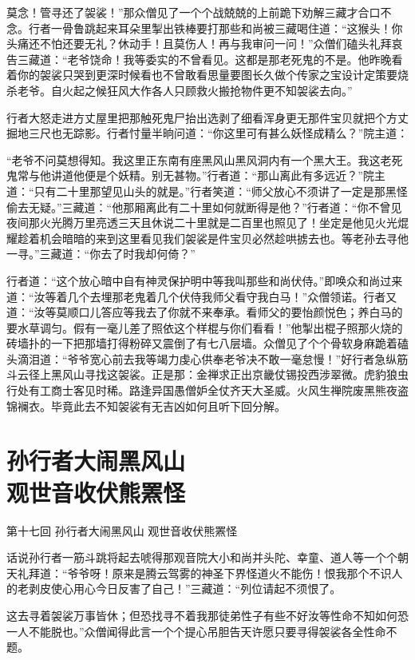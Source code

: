 \documentclass[12pt,UTF8]{ctexbook}
\begin{document}
{莫念！管寻还了袈裟！”那众僧见了一个个战兢兢的上前跪下劝解三藏才合口不念。行者一骨鲁跳起来耳朵里掣出铁棒要打那些和尚被三藏喝住道：“这猴头！你头痛还不怕还要无礼？休动手！且莫伤人！再与我审问一问！”众僧们磕头礼拜哀告三藏道：“老爷饶命！我等委实的不曾看见。这都是那老死鬼的不是。他昨晚看着你的袈裟只哭到更深时候看也不曾敢看思量要图长久做个传家之宝设计定策要烧杀老爷。自火起之候狂风大作各人只顾救火搬抢物件更不知袈裟去向。”

行者大怒走进方丈屋里把那触死鬼尸抬出选剥了细看浑身更无那件宝贝就把个方丈掘地三尺也无踪影。行者忖量半晌问道：“你这里可有甚么妖怪成精么？”院主道：

“老爷不问莫想得知。我这里正东南有座黑风山黑风洞内有一个黑大王。我这老死鬼常与他讲道他便是个妖精。别无甚物。”行者道：“那山离此有多远近？”院主道：“只有二十里那望见山头的就是。”行者笑道：“师父放心不须讲了一定是那黑怪偷去无疑。”三藏道：“他那厢离此有二十里如何就断得是他？”行者道：“你不曾见夜间那火光腾万里亮透三天且休说二十里就是二百里也照见了！坐定是他见火光焜耀趁着机会暗暗的来到这里看见我们袈裟是件宝贝必然趁哄掳去也。等老孙去寻他一寻。”三藏道：“你去了时我却何倚？”

行者道：“这个放心暗中自有神灵保护明中等我叫那些和尚伏侍。”即唤众和尚过来道：“汝等着几个去埋那老鬼着几个伏侍我师父看守我白马！”众僧领诺。行者又道：“汝等莫顺口儿答应等我去了你就不来奉承。看师父的要怡颜悦色；养白马的要水草调匀。假有一毫儿差了照依这个样棍与你们看看！”他掣出棍子照那火烧的砖墙扑的一下把那墙打得粉碎又震倒了有七八层墙。众僧见了个个骨软身麻跪着磕头滴泪道：“爷爷宽心前去我等竭力虔心供奉老爷决不敢一毫怠慢！”好行者急纵筋斗云径上黑风山寻找这袈裟。正是那：金禅求正出京畿仗锡投西涉翠微。虎豹狼虫行处有工商士客见时稀。路逢异国愚僧妒全仗齐天大圣威。火风生禅院废黑熊夜盗锦襕衣。毕竟此去不知袈裟有无吉凶如何且听下回分解。

\chapter[孙行者大闹黑风山\ 观世音收伏熊罴怪]{孙行者大闹黑风山\\观世音收伏熊罴怪}

第十七回 孙行者大闹黑风山 观世音收伏熊罴怪

话说孙行者一筋斗跳将起去唬得那观音院大小和尚并头陀、幸童、道人等一个个朝天礼拜道：“爷爷呀！原来是腾云驾雾的神圣下界怪道火不能伤！恨我那个不识人的老剥皮使心用心今日反害了自己！”三藏道：“列位请起不须恨了。

这去寻着袈裟万事皆休；但恐找寻不着我那徒弟性子有些不好汝等性命不知如何恐一人不能脱也。”众僧闻得此言一个个提心吊胆告天许愿只要寻得袈裟各全性命不题。

}
\end{document}
